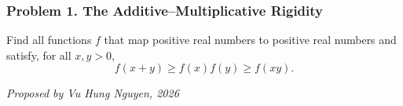 \subsubsection*{Problem 1. The Additive--Multiplicative Rigidity}

\begin{exercisebox}[hard]

Find all functions $f$ that map positive real numbers to positive real
numbers and satisfy, for all $x,y>0$,
\[
f(x+y)\geq f(x)f(y)\geq f(xy).
\]

\begin{flushright}
\textit{Proposed by Vu Hung Nguyen, 2026}
\end{flushright}


\end{exercisebox}